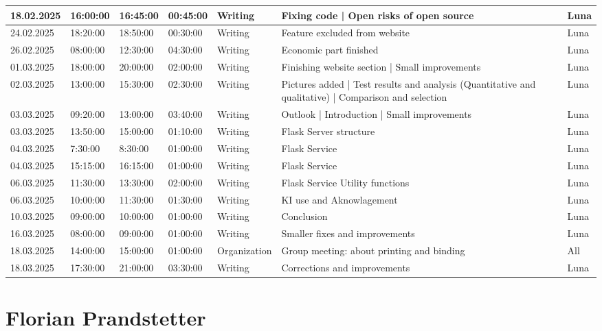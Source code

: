 \begin{longtable}{@{}p{1.6cm} p{1.1cm} p{1.1cm} p{1.1cm} p{2cm} p{4.5cm} p{1.5cm}@{}}
\hline
18.02.2025 & 16:00:00 & 16:45:00 & 00:45:00 & Writing & Fixing code | Open risks of open source & Luna \\
\hline
24.02.2025 & 18:20:00 & 18:50:00 & 00:30:00 & Writing & Feature excluded from website & Luna \\
\hline
26.02.2025 & 08:00:00 & 12:30:00 & 04:30:00 & Writing & Economic part finished & Luna \\
\hline
01.03.2025 & 18:00:00 & 20:00:00 & 02:00:00 & Writing & Finishing website section | Small improvements & Luna \\
\hline
02.03.2025 & 13:00:00 & 15:30:00 & 02:30:00 & Writing & Pictures added | Test results and analysis (Quantitative and qualitative) | Comparison and selection & Luna \\
\hline
03.03.2025 & 09:20:00 & 13:00:00 & 03:40:00 & Writing & Outlook | Introduction | Small improvements & Luna \\
\hline
03.03.2025 & 13:50:00 & 15:00:00 & 01:10:00 & Writing & Flask Server structure & Luna \\
\hline
04.03.2025 & 7:30:00 & 8:30:00 & 01:00:00 & Writing & Flask Service & Luna \\
\hline
04.03.2025 & 15:15:00 & 16:15:00 & 01:00:00 & Writing & Flask Service & Luna \\
\hline
06.03.2025 & 11:30:00 & 13:30:00 & 02:00:00 & Writing & Flask Service Utility functions & Luna \\
\hline
06.03.2025 & 10:00:00 & 11:30:00 & 01:30:00 & Writing & KI use and Aknowlagement & Luna \\
\hline
10.03.2025 & 09:00:00 & 10:00:00 & 01:00:00 & Writing & Conclusion & Luna \\
\hline
16.03.2025 & 08:00:00 & 09:00:00 & 01:00:00 & Writing & Smaller fixes and improvements & Luna \\
\hline
18.03.2025 & 14:00:00 & 15:00:00 & 01:00:00 & Organization & Group meeting: about printing and binding & All \\
\hline
18.03.2025 & 17:30:00 & 21:00:00 & 03:30:00 & Writing & Corrections and improvements & Luna \\

\end{longtable}



\section{Florian Prandstetter}

